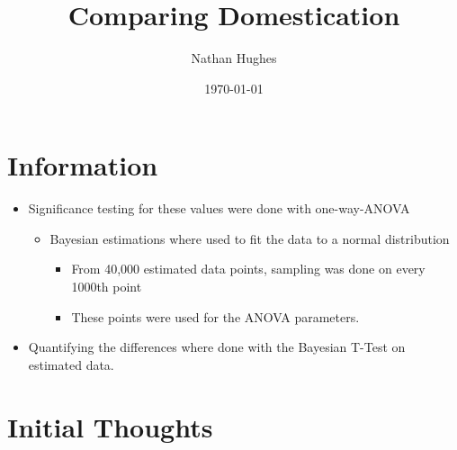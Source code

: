 \documentclass[a4paper]{article}
\author{Nathan Hughes}
\date{\today}
\title{Comparing Domestication}
\begin{document}
\maketitle

\section*{Information}
\label{sec-1}
\begin{itemize}
\item Significance testing for these values were done with one-way-ANOVA
\begin{itemize}
\item Bayesian estimations where used to fit the data to a normal distribution
\begin{itemize}
\item From 40,000 estimated data points, sampling was done on every 1000th point
\item These points were used for the ANOVA parameters.
\end{itemize}
\end{itemize}
\item Quantifying the differences where done with the Bayesian T-Test on estimated data.
\end{itemize}

\section*{Initial Thoughts}
\label{sec-2}
\end{document}
